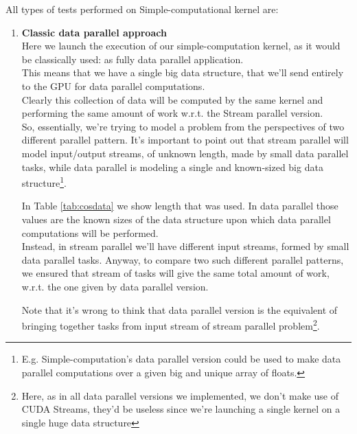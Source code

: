 All types of tests performed on Simple-computational kernel are:
\begin{enumerate}
	\item \textbf{Classic data parallel approach}\\
		Here we launch the execution of our simple-computation kernel, as it would be classically used: as fully data parallel application.\\
		This means that we have a single big data structure, that we'll send entirely to the GPU for data parallel computations.\\
		Clearly this collection of data will be computed by the same kernel and performing the same amount of work w.r.t. the Stream parallel version.\\
		So, essentially, we're trying to model a problem from the perspectives of two different parallel pattern. It's important to point out that stream parallel will model input/output streams, of unknown length, made by small data parallel tasks, while data parallel is modeling a single and known-sized big data structure\footnote{E.g. Simple-computation's data parallel version could be used to make data parallel computations over a given big and unique array of floats.}.
		
		In Table \ref{tab:cosdata} we show length that was used.
		In data parallel those values are the known sizes of the data structure upon which data parallel computations will be performed.\\
		Instead, in stream parallel we'll have different input streams, formed by small data parallel tasks. Anyway, to compare two such different parallel patterns, we ensured that stream of tasks will give the same total amount of work, w.r.t. the one given by data parallel version.
		
		Note that it's wrong to think that data parallel version is the equivalent of bringing together tasks from input stream of stream parallel problem\footnote{Here, as in all data parallel versions we implemented, we don't make use of CUDA Streams, they'd be useless since we're launching a single kernel on a single huge data structure}.


\end{enumerate}
